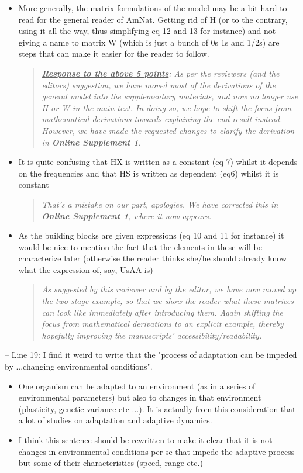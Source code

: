 \documentclass[11pt]{article}
\begin{document}
\begin{itemize}
	\item More generally, the matrix formulations of the model may be a bit hard to read for the general reader of AmNat. Getting rid of H (or to the contrary, using it all the way, thus simplifying eq 12 and 13 for instance) and not giving a name to matrix W (which is just a bunch of 0s 1s and 1/2s) are steps that can make it easier for the reader to follow.
\begin{quote}
	{\itshape {\bf \ul{Response to the above 5 points}}: As per the reviewers (and the editors) suggestion, we have moved most of the derivations of the general model into the supplementary materials, and now no longer use H or W in the main text. In doing so, we hope to shift the focus from mathematical derivations towards explaining the end result instead. However, we have made the requested changes to clarify the derivation in {\bf Online Supplement 1}. }
\end{quote}

	\item It is quite confusing that HX is written as a constant (eq 7) whilst it depends on the frequencies and that HS is written as dependent (eq6) whilst it is constant
	\begin{quote}
	{\itshape That's a mistake on our part, apologies. We have corrected this in {\bf Online Supplement 1}, where it now appears.}
\end{quote}
	\item As the building blocks are given expressions (eq 10 and 11 for instance) it would be nice to mention the fact that the elements in these will be characterize later (otherwise the reader thinks she/he should already know what the expression of, say, UsAA is)
\begin{quote}
	{\itshape As suggested by this reviewer and by the editor, we have now moved up the two stage example, so that we show the reader what these matrices can look like immediately after introducing them. Again shifting the focus from mathematical derivations to an explicit example, thereby hopefully improving the manuscripts' accessibility/readability.  }
\end{quote}

\end{itemize}

\noindent -- Line 19: I find it weird to write that the "process of adaptation can be impeded by ...changing environmental conditions".

\begin{itemize}
	\item One organism can be adapted to an environment (as in a series of environmental parameters) but also to changes in that environment (plasticity, genetic variance etc ...). It is actually from this consideration that a lot of studies on adaptation and adaptive dynamics.
	\item I think this sentence should be rewritten to make it clear that it is not changes in environmental conditions per se that impede the adaptive process but some of their characteristics (speed, range etc.)
\end{itemize}
\end{document}
